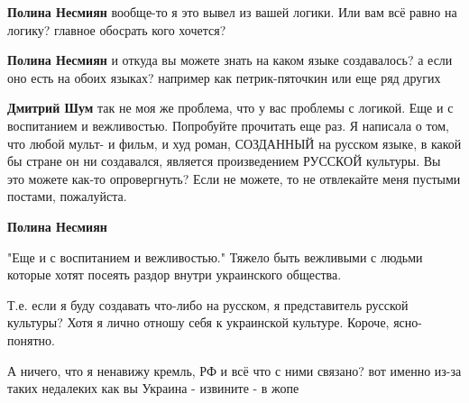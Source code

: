 \begin{itemize}
\begin{itemize}
 
\textbf{Полина Несмиян} вообще-то я это вывел из вашей логики. Или вам всё равно на логику? главное обосрать кого хочется?

 
\textbf{Полина Несмиян} и откуда вы можете знать на каком языке создавалось? а
если оно есть на обоих языках? например как петрик-пяточкин или еще ряд других

 
\textbf{Дмитрий Шум} так не моя же проблема, что у вас проблемы с логикой. Еще
и с воспитанием и вежливостью. Попробуйте прочитать еще раз. Я написала о том,
что любой мульт- и фильм, и худ роман, СОЗДАННЫЙ на русском языке, в какой бы
стране он ни создавался, является произведением РУССКОЙ культуры. Вы это можете
как-то опровергнуть? Если не можете, то не отвлекайте меня пустыми постами,
пожалуйста.

 
\textbf{Полина Несмиян} 

"Еще и с воспитанием и вежливостью." Тяжело быть
вежливыми с людьми которые хотят посеять раздор внутри украинского общества.

Т.е. если я буду создавать что-либо на русском, я представитель русской
культуры? Хотя я лично отношу себя к украинской культуре. Короче, ясно-понятно.

А ничего, что я ненавижу кремль, РФ и всё что с ними связано? вот именно из-за
таких недалеких как вы Украина - извините - в жопе


\end{itemize}
\end{itemize}
